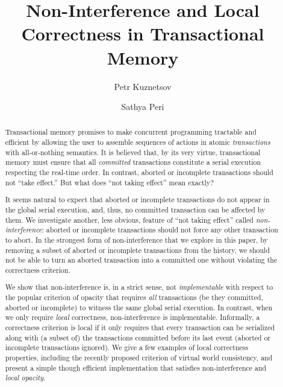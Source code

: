 \documentclass{llncs}
\newcommand{\remove}[1]{}
\begin{document}



\title{Non-Interference and Local Correctness in Transactional Memory}


\author{
Petr Kuznetsov \and
Sathya Peri
}



\remove{
\authorinfo{Petr Kuznetsov}
           {Telekom Innovation Lab, TU Berlin}
           {petr.kuznetsov@tu-berlin.de}
\authorinfo{Sathya Peri}
           {IIT Patna}
           {sathya@iitp.ac.in}
}


\date{}
\maketitle 



\begin{abstract}
Transactional memory promises to make concurrent programming tractable and efficient 
by allowing the user to assemble sequences of actions in atomic \emph{transactions}
with all-or-nothing semantics.
It is believed that, by its very virtue, 
transactional memory
must ensure that 
all \emph{committed} transactions constitute a serial execution respecting
the real-time order. In contrast, aborted or incomplete transactions should not ``take effect.'' 
But what does ``not taking effect'' mean exactly? 

It seems natural to expect that aborted or incomplete transactions do
not appear in the global serial execution, and, thus, no committed
transaction can be affected by them.
We investigate another, less obvious, feature of ``not taking effect'' called 
\emph{non-interference}: aborted or incomplete transactions should not force
any other transaction to abort.
In the strongest form of non-interference that we explore in this paper, by removing a subset of
aborted or incomplete transactions from the history, we should not be able to 
turn an aborted transaction into a committed one without violating the
correctness criterion.     

We show that non-interference is, in a strict sense, not
\emph{implementable} with respect to 
the popular criterion of opacity that requires \emph{all} transactions (be they committed, aborted or incomplete) 
to witness the same
global serial execution. 
In  contrast, when we only require \emph{local}
correctness, non-interference is
implementable. 
Informally, a correctness criterion is local if it only 
requires that every transaction can be serialized along with (a subset
of) the transactions committed before its last event 
(aborted or incomplete transactions ignored). 
We give a few examples of local correctness properties, including the
recently proposed criterion of virtual world consistency, and present
a simple though efficient
implementation that satisfies non-interference and \emph{local opacity}.
\end{abstract}
\end{document}
